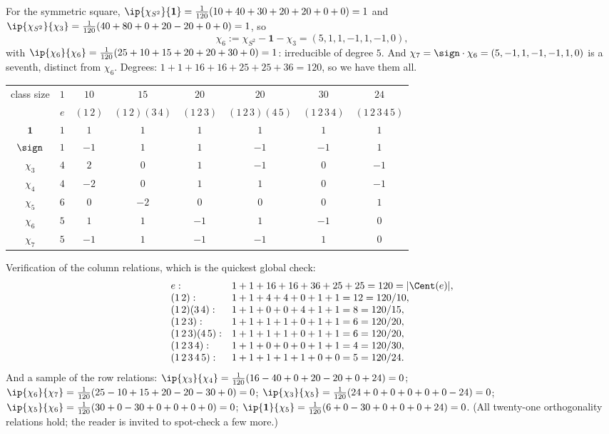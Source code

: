 For the symmetric square, $\ip{\chi_{S^2}}{\mathbf 1} = \frac1{120}(10+40+30+20+20+0+0) = 1$ and $\ip{\chi_{S^2}}{\chi_3} = \frac1{120}(40 + 80 + 0 + 20 - 20 + 0 + 0) = 1$, so
$$\chi_6 := \chi_{S^2} - \mathbf 1 - \chi_3 = (5,1,1,-1,1,-1,0),$$
with $\ip{\chi_6}{\chi_6} = \frac1{120}(25 + 10 + 15 + 20 + 20 + 30 + 0) = 1$: irreducible of degree $5$. And $\chi_7 = \sign\cdot\chi_6 = (5,-1,1,-1,-1,1,0)$ is a seventh, distinct from $\chi_6$. Degrees: $1+1+16+16+25+25+36 = 120$, so we have them all.

\begin{center}
\renewcommand{\arraystretch}{1.35}
\setlength{\tabcolsep}{7pt}
\begin{tabular}{c|ccccccc}
\toprule
class size & $1$ & $10$ & $15$ & $20$ & $20$ & $30$ & $24$\\
 & $e$ & $(1\,2)$ & $(1\,2)(3\,4)$ & $(1\,2\,3)$ & $(1\,2\,3)(4\,5)$ & $(1\,2\,3\,4)$ & $(1\,2\,3\,4\,5)$\\
\midrule
$\mathbf 1$ & $1$ & $1$ & $1$ & $1$ & $1$ & $1$ & $1$\\
$\sign$ & $1$ & $-1$ & $1$ & $1$ & $-1$ & $-1$ & $1$\\
$\chi_3$ & $4$ & $2$ & $0$ & $1$ & $-1$ & $0$ & $-1$\\
$\chi_4$ & $4$ & $-2$ & $0$ & $1$ & $1$ & $0$ & $-1$\\
$\chi_5$ & $6$ & $0$ & $-2$ & $0$ & $0$ & $0$ & $1$\\
$\chi_6$ & $5$ & $1$ & $1$ & $-1$ & $1$ & $-1$ & $0$\\
$\chi_7$ & $5$ & $-1$ & $1$ & $-1$ & $-1$ & $1$ & $0$\\
\bottomrule
\end{tabular}
\end{center}

Verification of the column relations, which is the quickest global check:
$$\begin{array}{ll}
e: & 1+1+16+16+36+25+25 = 120 = |\Cent(e)|,\\
(1\,2): & 1+1+4+4+0+1+1 = 12 = 120/10,\\
(1\,2)(3\,4): & 1+1+0+0+4+1+1 = 8 = 120/15,\\
(1\,2\,3): & 1+1+1+1+0+1+1 = 6 = 120/20,\\
(1\,2\,3)(4\,5): & 1+1+1+1+0+1+1 = 6 = 120/20,\\
(1\,2\,3\,4): & 1+1+0+0+0+1+1 = 4 = 120/30,\\
(1\,2\,3\,4\,5): & 1+1+1+1+1+0+0 = 5 = 120/24.
\end{array}$$
And a sample of the row relations: $\ip{\chi_3}{\chi_4} = \frac1{120}(16 - 40 + 0 + 20 - 20 + 0 + 24) = 0$; $\ip{\chi_6}{\chi_7} = \frac1{120}(25 - 10 + 15 + 20 - 20 - 30 + 0) = 0$; $\ip{\chi_3}{\chi_5} = \frac1{120}(24 + 0 + 0 + 0 + 0 + 0 - 24) = 0$; $\ip{\chi_5}{\chi_6} = \frac1{120}(30 + 0 - 30 + 0+0+0+0) = 0$; $\ip{\mathbf 1}{\chi_5} = \frac1{120}(6 + 0 - 30 + 0 + 0 + 0 + 24) = 0$. (All twenty-one orthogonality relations hold; the reader is invited to spot-check a few more.)

